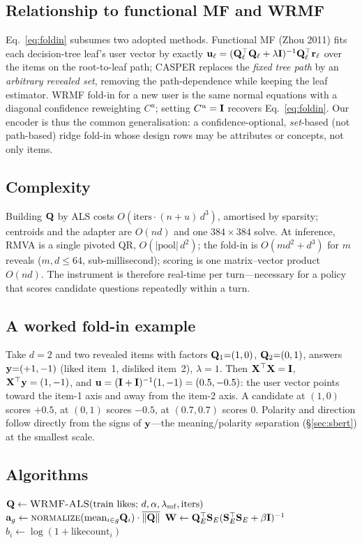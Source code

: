\subsection{Relationship to functional MF and WRMF}
Eq.~\eqref{eq:foldin} subsumes two adopted methods. Functional MF (Zhou 2011) fits each decision-tree leaf's user
vector by exactly $\mathbf{u}_\ell=(\mathbf{Q}_\ell^\top\mathbf{Q}_\ell+\lambda\mathbf{I})^{-1}\mathbf{Q}_\ell^\top\mathbf r_\ell$ over the items on the
root-to-leaf path; CASPER replaces the \emph{fixed tree path} by an \emph{arbitrary revealed set}, removing the
path-dependence while keeping the leaf estimator. WRMF fold-in for a new user is the same normal equations with a
diagonal confidence reweighting $C^u$; setting $C^u=\mathbf{I}$ recovers Eq.~\eqref{eq:foldin}. Our encoder is thus the
common generalisation: a confidence-optional, \emph{set}-based (not path-based) ridge fold-in whose design rows may
be attributes or concepts, not only items.

\subsection{Complexity}
Building $\mathbf{Q}$ by ALS costs $O(\text{iters}\cdot(n{+}u)\,d^3)$, amortised by sparsity; centroids and the adapter are
$O(nd)$ and one $384{\times}384$ solve. At inference, RMVA is a single pivoted QR, $O(|\text{pool}|\,d^2)$; the
fold-in is $O(md^2+d^3)$ for $m$ reveals ($m,d\le 64$, sub-millisecond); scoring is one matrix--vector product
$O(nd)$. The instrument is therefore real-time per turn---necessary for a policy that scores candidate questions
repeatedly within a turn.

\subsection{A worked fold-in example}
Take $d{=}2$ and two revealed items with factors $\mathbf{Q}_1{=}(1,0)$, $\mathbf{Q}_2{=}(0,1)$, answers $\mathbf{y}{=}(+1,-1)$ (liked
item~1, disliked item~2), $\lambda{=}1$. Then $\mathbf{X}^\top\mathbf{X}=\mathbf{I}$, $\mathbf{X}^\top\mathbf{y}=(1,-1)$, and
$\mathbf{u}=(\mathbf{I}+\mathbf{I})^{-1}(1,-1)=(0.5,-0.5)$: the user vector points toward the item-1 axis and away from the item-2 axis.
A candidate at $(1,0)$ scores $+0.5$, at $(0,1)$ scores $-0.5$, at $(0.7,0.7)$ scores $0$. Polarity and direction
follow directly from the signs of $\mathbf{y}$---the meaning/polarity separation (\S\ref{sec:sbert}) at the smallest
scale.

\subsection{Algorithms}
\begin{algorithm}[h]\small
\caption{Build the instrument (offline)}
\begin{algorithmic}[1]
\State $\mathbf{Q} \gets \textsc{WRMF-ALS}(\text{train likes};\,d,\alpha,\lambda_{\mathrm{mf}},\text{iters})$
 $\mathbf a_g \gets \textsc{normalize}(\text{mean}_{i\in g}\mathbf{Q}_i)\cdot\overline{\lVert\mathbf{Q}\rVert}$ \EndFor
\State $\mathbf{W} \gets \mathbf{Q}_E^\top \mathbf S_E(\mathbf S_E^\top \mathbf S_E+\beta\mathbf{I})^{-1}$ 
\State $b_i \gets \log(1+\text{likecount}_i)$
\end{algorithmic}
\end{algorithm}

